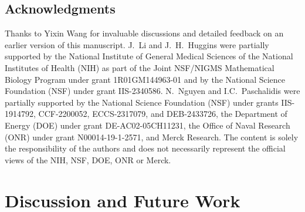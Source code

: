 
\section*{Acknowledgments}
Thanks to Yixin Wang for invaluable discussions and detailed feedback on an earlier version of this manuscript.
J.~Li and J.~H.~Huggins were partially supported by the National Institute of General Medical Sciences of the National Institutes of Health (NIH)
as part of the Joint NSF/NIGMS Mathematical Biology Program under grant 1R01GM144963-01
and by the National Science Foundation (NSF) under grant IIS-2340586.
N.~Nguyen and I.C.~Paschalidis were partially supported by the National Science Foundation (NSF) under grants IIS-1914792, CCF-2200052, ECCS-2317079, and DEB-2433726, the Department of Energy (DOE) under grant DE-AC02-05CH11231, the Office of Naval Research (ONR) under grant N00014-19-1-2571, and Merck Research.
The content is solely the responsibility of the authors and does not necessarily represent the official views of the NIH, NSF, DOE, ONR or Merck.

\chapter{Discussion and Future Work}\label{chap:discussion}
